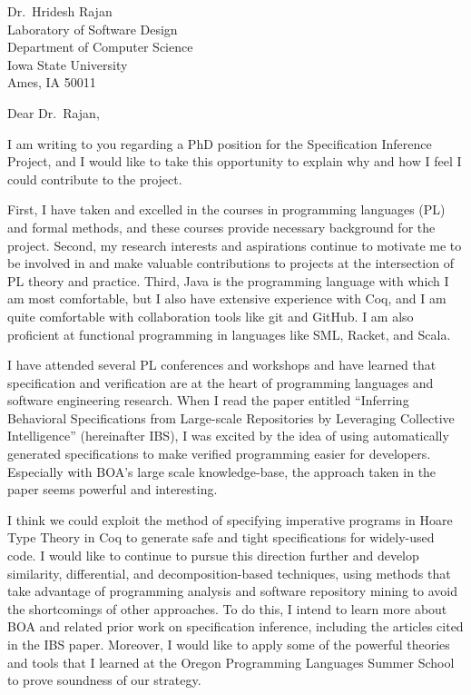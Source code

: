 \documentclass{letter}
\begin{document}
 
\begin{letter}{%
    Dr.~Hridesh Rajan\\
    Laboratory of Software Design\\
    Department of Computer Science\\
    Iowa State University \\
    Ames, IA 50011}
\date{\today}
\opening{Dear Dr.~Rajan,}

I am writing to you regarding a PhD position for the Specification Inference Project,
and I would like to take this opportunity to explain why and how I feel I
could contribute to the project.

First, I have taken and excelled in the courses in programming languages (PL)
and formal methods, and these courses provide necessary background for the project.
Second, my research interests and aspirations continue to motivate me to be involved in
and make valuable contributions to projects at the intersection of PL
theory and practice.
Third, Java is the programming language with which I am most comfortable,
but I also have extensive experience with Coq, and I am quite comfortable with
collaboration tools like git and GitHub.
I am also proficient at functional programming in languages like SML, Racket,
and Scala.%


I have attended several PL conferences and workshops and
have learned that specification and verification are at the heart of 
programming languages and software engineering research.
When I read the paper entitled
``Inferring Behavioral Specifications from Large-scale Repositories
by Leveraging Collective Intelligence''
(hereinafter IBS), I was excited by the idea of using automatically generated
specifications to make verified programming easier for developers.
Especially with BOA's large scale knowledge-base, the approach taken in the paper seems
powerful and interesting.

I think we could exploit the method of specifying imperative programs in Hoare Type Theory
in Coq to generate safe and tight specifications for widely-used code. I would like to
continue to pursue this direction further and develop similarity, differential, and
decomposition-based techniques, using methods that take advantage of programming analysis
and software repository mining to avoid the shortcomings of other approaches.
To do this, I intend to learn more about BOA and related prior work on
specification inference, including the articles cited in the IBS paper.
Moreover, I would like to apply some of the powerful theories and tools that I learned
at the Oregon Programming Languages Summer School to prove soundness of our strategy.


\end{letter}
\end{document}
